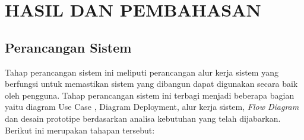 \fancyhf{} 
 \fancyfoot[R]{\thepage}
\chapter{HASIL DAN PEMBAHASAN}


\section{Perancangan Sistem}

Tahap perancangan sistem ini meliputi perancangan alur kerja sistem yang berfungsi untuk memastikan sistem yang dibangun dapat digunakan secara baik oleh pengguna. Tahap perancangan sistem ini terbagi menjadi beberapa bagian yaitu diagram Use Case , Diagram Deployment, alur kerja sistem, \textit{Flow Diagram} dan desain prototipe berdasarkan analisa kebutuhan yang telah dijabarkan. Berikut ini merupakan tahapan tersebut:



